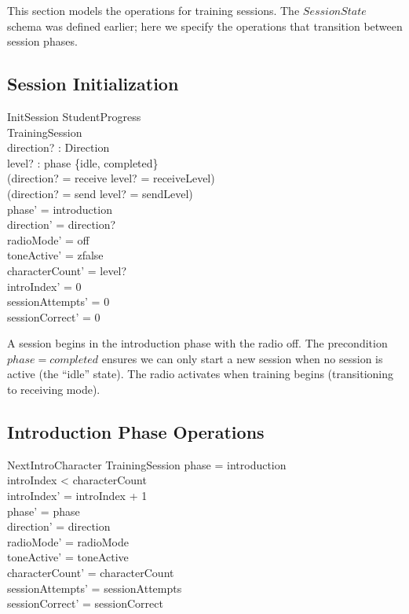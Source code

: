 \documentclass[a4paper,10pt,fleqn]{article}
\begin{document}
This section models the operations for training sessions. The $SessionState$
schema was defined earlier; here we specify the operations that transition
between session phases.

\subsection{Session Initialization}

\begin{schema}{InitSession}
\Xi StudentProgress \\
\Delta TrainingSession \\
direction? : Direction \\
level? : \nat
\where
phase \in \{idle, completed\} \\
(direction? = receive \land level? = receiveLevel) \\
\lor (direction? = send \land level? = sendLevel) \\
phase' = introduction \\
direction' = direction? \\
radioMode' = off \\
toneActive' = zfalse \\
characterCount' = level? \\
introIndex' = 0 \\
sessionAttempts' = 0 \\
sessionCorrect' = 0
\end{schema}

A session begins in the introduction phase with the radio off. The precondition
$phase = completed$ ensures we can only start a new session when no session is
active (the ``idle'' state). The radio activates when training begins
(transitioning to receiving mode).

\subsection{Introduction Phase Operations}

\begin{schema}{NextIntroCharacter}
\Delta TrainingSession
\where
phase = introduction \\
introIndex < characterCount \\
introIndex' = introIndex + 1 \\
phase' = phase \\
direction' = direction \\
radioMode' = radioMode \\
toneActive' = toneActive \\
characterCount' = characterCount \\
sessionAttempts' = sessionAttempts \\
sessionCorrect' = sessionCorrect
\end{schema}
\end{document}
